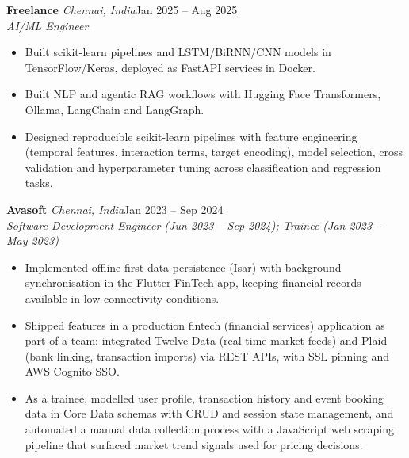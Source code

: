 \documentclass[a4paper,11pt]{article}
\newcommand{\role}[4]{%
  \textbf{#1}{\color{muted}\,\textperiodcentered\,\textit{#2}}\hfill{\color{muted}#3}\\
  \textit{#4}\par}
\newcommand{\gap}{\vspace{5pt}}
\begin{document}
\gap
{}
\role{Freelance}{Chennai, India}{Jan 2025 – Aug 2025}{AI/ML Engineer}
\begin{itemize}
  \item Built scikit-learn pipelines and LSTM/BiRNN/CNN models in TensorFlow/Keras, deployed as FastAPI services in Docker.
  \item Built NLP and agentic RAG workflows with Hugging Face Transformers, Ollama, LangChain and LangGraph.
  \item Designed reproducible scikit-learn pipelines with feature engineering (temporal features, interaction terms, target encoding), model selection, cross validation and hyperparameter tuning across classification and regression tasks.
\end{itemize}
\gap
{}
\role{Avasoft}{Chennai, India}{Jan 2023 – Sep 2024}{Software Development Engineer (Jun 2023 – Sep 2024); Trainee (Jan 2023 – May 2023)}
\begin{itemize}
  \item Implemented offline first data persistence (Isar) with background synchronisation in the Flutter FinTech app, keeping financial records available in low connectivity conditions.
  \item Shipped features in a production fintech (financial services) application as part of a team: integrated Twelve Data (real time market feeds) and Plaid (bank linking, transaction imports) via REST APIs, with SSL pinning and AWS Cognito SSO.
  \item As a trainee, modelled user profile, transaction history and event booking data in Core Data schemas with CRUD and session state management, and automated a manual data collection process with a JavaScript web scraping pipeline that surfaced market trend signals used for pricing decisions.
\end{itemize}
\end{document}

